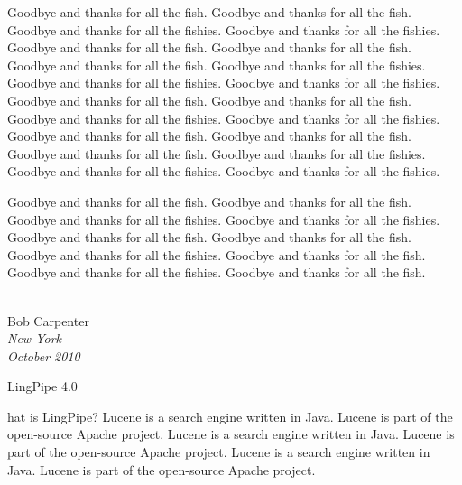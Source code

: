 \documentclass[10pt]{book}
\newcommand{\bookname}{LingPipe 4.0}
\newcommand{\firstchar}[1]{\noindent{\huge\bf #1}}
\begin{document}
Goodbye and thanks for all the fish.
Goodbye and thanks for all the fish.
Goodbye and thanks for all the fishies.
Goodbye and thanks for all the fishies.
Goodbye and thanks for all the fish.
Goodbye and thanks for all the fish.
Goodbye and thanks for all the fish.
Goodbye and thanks for all the fishies.
Goodbye and thanks for all the fishies.
Goodbye and thanks for all the fishies.
Goodbye and thanks for all the fish.
Goodbye and thanks for all the fish.
Goodbye and thanks for all the fishies.
Goodbye and thanks for all the fishies.
Goodbye and thanks for all the fish.
Goodbye and thanks for all the fish.
Goodbye and thanks for all the fish.
Goodbye and thanks for all the fishies.
Goodbye and thanks for all the fishies.
Goodbye and thanks for all the fishies.

Goodbye and thanks for all the fish.
Goodbye and thanks for all the fish.
Goodbye and thanks for all the fishies.
Goodbye and thanks for all the fishies.
Goodbye and thanks for all the fish.
Goodbye and thanks for all the fish.
Goodbye and thanks for all the fishies.
Goodbye and thanks for all the fish.
Goodbye and thanks for all the fishies.
Goodbye and thanks for all the fish.
\\[0.2in]
\newlength{\sigWidth}
\mbox{ }
\hfill
\parbox{\sigWidth}{
Bob Carpenter
\\[2pt]\small
\it New York
\\
October 2010}



\clearpage
\pagestyle{empty}
\cleardoublepage
\vspace*{2.375in}
\begin{center}
{\hfill {\Huge \bookname}}
\end{center}




%
\setcounter{page}{1}%
%
\pagestyle{fancy}%

\firstchar{W}hat is LingPipe?
Lucene is a search engine written in Java.  Lucene is part of the
open-source Apache project.
Lucene is a search engine written in Java.  Lucene is part of the
open-source Apache project.
Lucene is a search engine written in Java.  Lucene is part of the
open-source Apache project.

\end{document}
